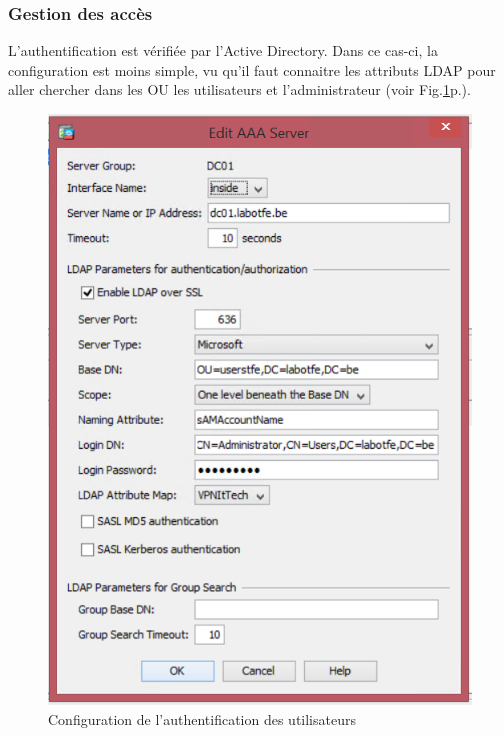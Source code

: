 \subsubsection{Gestion des accès}
L'authentification est vérifiée par l'Active Directory. 
Dans ce cas-ci, la configuration est moins simple, vu qu'il faut connaitre les attributs LDAP pour aller chercher dans les OU les utilisateurs et l'administrateur (voir Fig.\ref{fig:authCisco}p.\pageref{fig:authCisco}).
\begin{figure}[ht]
	\centering
	\includegraphics{Cisco/AAA-Ldap.png}
	\caption{Configuration de l'authentification des utilisateurs}
	\label{fig:authCisco}
\end{figure}

